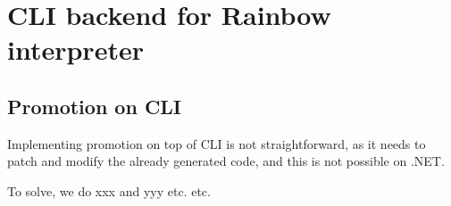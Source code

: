 \section{CLI backend for Rainbow interpreter}

\subsection{Promotion on CLI}

Implementing promotion on top of CLI is not straightforward, as it needs to
patch and modify the already generated code, and this is not possible on .NET.

To solve, we do xxx and yyy etc. etc.
